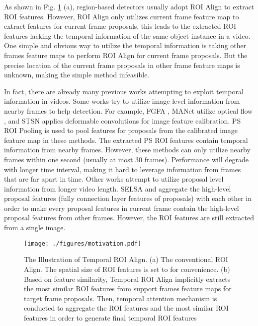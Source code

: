 \documentclass[letterpaper]{article} \usepackage{aaai21}  \usepackage{times}  \usepackage{helvet} \usepackage{courier}  \usepackage[hyphens]{url}  \usepackage{graphicx} \usepackage{hyperref}
\begin{document}
As shown in Fig. \ref{fig:motivation} (a), region-based detectors usually adopt ROI Align \cite{He_2017_ICCV} to extract ROI features. However, ROI Align only utilizes current frame feature map to extract features for current frame proposals, this leads to the extracted ROI features lacking the temporal information of the same object instance in a video. One simple and obvious way to utilize the temporal information is taking other frames feature maps to perform ROI Align for current frame proposals. But the precise location of the current frame proposals in other frame feature maps is unknown, making the simple method infeasible.

In fact, there are already many previous works \cite{zhu2017flow,wu2019sequence,xiao2018video,liu2018mobile,chen2018optimizing,deng2019object} attempting to exploit temporal information in videos. Some works try to utilize image level information from nearby frames to help detection. For example, FGFA \cite{zhu2017flow}, MANet \cite{wang2018fully} utilize optical flow \cite{dosovitskiy2015flownet}, and STSN \cite{bertasius2018object} applies deformable convolutions \cite{Dai_2017_ICCV} for image feature calibration. PS ROI Pooling \cite{dai2016r} is used to pool features for proposals from the calibrated image feature map in these methods. The extracted PS ROI features contain temporal information from nearby frames. However, these methods can only utilize  nearby frames within one second (usually at most 30 frames). Performance will degrade with longer time interval, making it hard to leverage information from frames that are far apart in time. Other works attempt to utilize proposal level information from longer video length. SELSA \cite{wu2019sequence} and \cite{shvets2019leveraging} aggregate the high-level proposal features (fully connection layer features of proposals) with each other in order to make every proposal features in current frame contain the high-level proposal features from other frames. However, the ROI features are still extracted from a single image.



\begin{figure}[t]
\centering
\texttt{[image: ./figures/motivation.pdf]}
\vspace{-0.25cm}
\caption{The Illustration of Temporal ROI Align. (a) The conventional ROI Align. The spatial size of ROI features is set to  for convenience. (b) Based on feature similarity, Temporal ROI Align implicitly extracts the most similar ROI features from support frames feature maps for target frame proposals. Then, temporal attention mechanism is conducted to aggregate the ROI features and the most similar ROI features in order to generate final temporal ROI features}
\label{fig:motivation}
\vspace{-0.35cm}
\end{figure}
\end{document}
